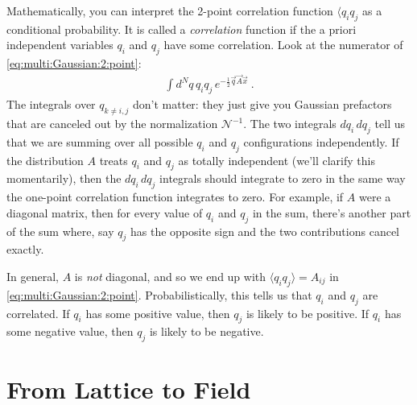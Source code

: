 Mathematically, you can interpret the 2-point correlation function $\langle q_i q_j$ as a conditional probability. It is called a \emph{correlation} function if the a priori independent variables $q_i$ and $q_j$ have some correlation. Look at the numerator of \eqref{eq:multi:Gaussian:2:point}:
\begin{align}
	\int d^Nq\, q_iq_j\, e^{-\frac{1}{2} \vec{q}\vec{A}\vec{x}} \ .
\end{align}
The integrals over $q_{k\neq i, j}$ don't matter: they just give you Gaussian prefactors that are canceled out by the normalization $\mathcal N^{-1}$. The two integrals $dq_i\, dq_j$ tell us that we are summing over all possible $q_i$ and $q_j$ configurations independently. If the distribution $A$ treats $q_i$ and $q_j$ as totally independent (we'll clarify this momentarily), then the $dq_i\, dq_j$ integrals should integrate to zero in the same way the one-point correlation function integrates to zero. For example, if $A$ were a diagonal matrix, then for every value of $q_i$ and $q_j$ in the sum, there's another part of the sum where, say $q_j$ has the opposite sign and the two contributions cancel exactly. 

In general, $A$ is \emph{not} diagonal, and so we end up with $\langle q_i q_j\rangle = A_{ij}$ in \eqref{eq:multi:Gaussian:2:point}. Probabilistically, this tells us that $q_i$ and $q_j$ are correlated. If $q_i$ has some positive value, then $q_j$ is likely to be positive. If $q_i$ has some negative value, then $q_j$ is likely to be negative. 

\section{From Lattice to Field} %


